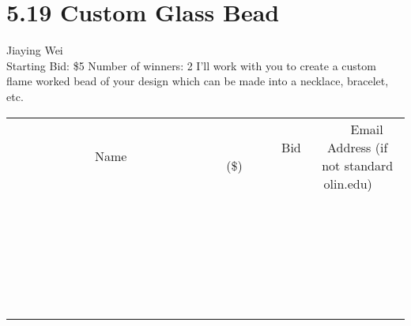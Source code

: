 \documentclass[11pt]{article}
\begin{document}
\section*{5.19 Custom Glass Bead}
Jiaying Wei
\\
Starting Bid: \$5
\newline
Number of winners: 2
\newline
I'll work with you to create a custom flame worked bead of your design which can be made into a necklace, bracelet, etc.
\\[6ex]
\begin{tabular}{c c c}
~~~~~~~~~~~~~Name~~~~~~~~~~~~~ & ~~~~~~~~~Bid (\$)~~~~~~~~~  & ~~~Email Address (if not standard olin.edu)~~~\\
 & & \\
\hline
 & & \\
\hline
 & & \\
\hline
 & & \\
\hline
 & & \\
\hline
 & & \\
\hline
 & & \\
\hline
 & & \\
\hline
 & & \\
\hline
 & & \\
\hline
 & & \\
\hline
 & & \\
\hline
 & & \\
\hline
 & & \\
\hline
 & & \\
\hline
 & & \\
\hline
 & & \\
\hline
 & & \\
\hline
 & & \\
\hline
 & & \\
\hline
 & & \\
\hline
 & & \\
\hline
 & & \\
\hline
 & & \\
\hline
 & & \\
\hline
 & & \\
\hline
\end{tabular}
\newpage
\end{document}
